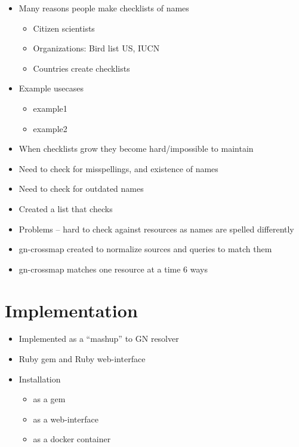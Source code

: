 \documentclass{bmcart}
\begin{document}
  \begin{itemize}

  \item Many reasons people make checklists of names
    \begin{itemize}
      \item Citizen scientists
      \item Organizations: Bird list US, IUCN
      \item Countries create checklists
    \end{itemize}
  \item Example usecases 
    \begin{itemize}
      \item example1
      \item example2
    \end{itemize}
  \item When checklists grow they become hard/impossible to maintain
  \item Need to check for misspellings, and existence of names
  \item Need to check for outdated names
  \item Created a list that checks
  \item Problems -- hard to check against resources as names are spelled
    differently
  \item gn-crossmap created to normalize sources and queries to match them
  \item gn-crossmap matches one resource at a time 6 ways
\end{itemize}

\section*{Implementation}
\begin{itemize}
  \item Implemented as a ``mashup'' to GN resolver
  \item Ruby gem and Ruby web-interface
  \item Installation
    \begin{itemize}
      \item as a gem
      \item as a web-interface
      \item as a docker container
    \end{itemize}
\end{itemize}
\end{document}
